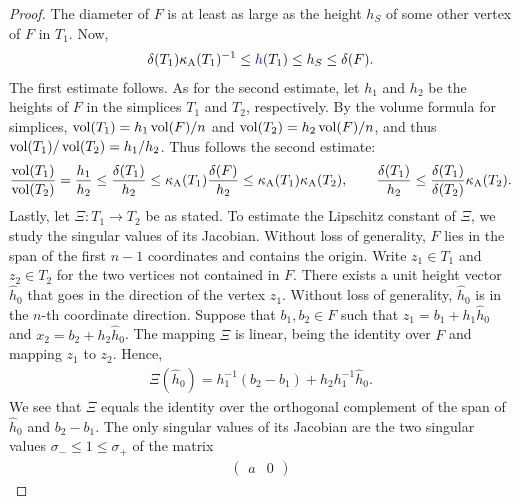 \documentclass[10pt,a4paper]{article}
\begin{document}
\begin{proof}
    The diameter of $F$ is at least as large as the height $h_S$ of some other vertex of $F$ in $T_{1}$. 
    Now, 
    \begin{align*}
        \diam(T_{1}) \aspectratio(T_{1})^{-1} \leq \height(T_{1}) \leq h_S \leq \diam(F).
    \end{align*}
    The first estimate follows. 
    As for the second estimate,
    let $h_1$ and $h_2$ be the heights of $F$ in the simplices $T_1$ and $T_2$, respectively. 
    By the volume formula for simplices, $\operatorname{vol}(T_1) = h_1 \operatorname{vol}(F)/n$ and $\operatorname{vol}(T_2) = h_2 \operatorname{vol}(F)/n$, and thus $\operatorname{vol}(T_1)/\operatorname{vol}(T_2) = h_1/h_2$. Thus follows the second estimate: 
    \begin{align*}
        \frac{ \operatorname{vol}(T_1) }{ \operatorname{vol}(T_2) }
        = 
        \frac{ h_1 }{ h_2 }
        \leq
        \frac{ {\delta}(T_1) }{ h_2 }
        \leq
        \kappa_{\rm A}(T_{1}) \frac{ {\delta}(F) }{ h_2 }
        \leq
        \kappa_{\rm A}(T_{1}) \kappa_{\rm A}(T_{2})
        ,
        \qquad 
        \frac{ {\delta}(T_1) }{ h_2 }
        \leq
        \frac{ {\delta}(T_1) }{ {\delta}(T_2) } \kappa_{\rm A}(T_{2})
        .
    \end{align*}
    Lastly, let $\Xi : T_1 \rightarrow T_2$ be as stated. 
    To estimate the Lipschitz constant of $\Xi$, we study the singular values of its Jacobian. 
    Without loss of generality, $F$ lies in the span of the first $n-1$ coordinates and contains the origin. 
    Write $z_1 \in T_1$ and $z_2 \in T_2$ for the two vertices not contained in $F$.
    There exists a unit height vector $\hat h_0$ that goes in the direction of the vertex $z_1$. 
    Without loss of generality, $\hat h_0$ is in the $n$-th coordinate direction.
    Suppose that $b_1, b_2 \in F$ such that $z_1 = b_1 + h_1 \hat h_0$ and $x_2 = b_2 + h_2 \hat h_0$.
    The mapping $\Xi$ is linear, being the identity over $F$ and mapping $z_1$ to $z_2$. Hence,
    \begin{align*}
        \Xi( \hat h_0 ) = h_1^{-1} ( b_2 - b_1 ) + h_2 h_{1}^{-1} \hat h_0.
    \end{align*}
    We see that $\Xi$ equals the identity over the orthogonal complement of the span of $\hat h_0$ and $b_2 - b_1$.
    The only singular values of its Jacobian are the two singular values $\sigma_{-} \leq 1 \leq \sigma_{+}$ of the matrix 
    \begin{align*}
        \begin{pmatrix}
            a & 0 

\end{pmatrix}
\end{align*}
\end{proof}
\end{document}

